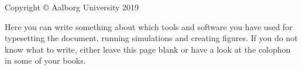 \thispagestyle{empty}
{\small
\strut\vfill %
\noindent Copyright \copyright{} Aalborg University 2019\par
\vspace{0.2cm}
\noindent Here you can write something about which tools and software you have used for typesetting the document, running simulations and creating figures. If you do not know what to write, either leave this page blank or have a look at the colophon in some of your books.
}
\clearpage

